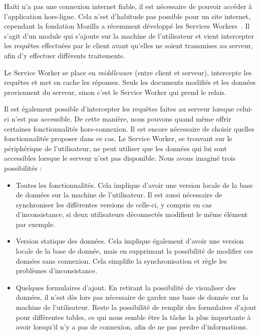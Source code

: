 \documentclass{EPL-master-thesis-covers-FR}
\begin{document}
				Haïti n'a pas une connexion internet fiable, il est nécessaire de pouvoir accéder à l'application hors-ligne. Cela n'est d'habitude pas possible pour un site internet, cependant la fondation Mozilla a récemment développé les Services Workers~\cite{ref:serviceworker}. Il s'agit d'un module qui s'ajoute sur la machine de l'utilisateur et vient intercepter les requêtes effectuées par le client avant qu'elles ne soient transmises au serveur, afin d'y effectuer différents traitements.

				Le Service Worker se place en \emph{middleware} (entre client et serveur), intercepte les requêtes et met en cache les réponses. Seuls les documents modifiés et les données proviennent du serveur, sinon c'est le Service Worker qui prend le relais.

				Il est également possible d'intercepter les requêtes faites au serveur lorsque celui-ci n'est pas accessible. De cette manière, nous pouvons quand même offrir certaines fonctionnalités hors-connexion. Il est encore nécessaire de choisir quelles fonctionnalités proposer dans ce cas. Le Service Worker, se trouvant sur le périphérique de l'utilisateur, ne peut utiliser que les données qui lui sont accessibles lorsque le serveur n'est pas disponible. Nous avons imaginé trois possibilités :

				\begin{itemize}
					\item Toutes les fonctionnalités. Cela implique d'avoir une version locale de la base de données sur la machine de l'utilisateur. Il est aussi nécessaire de synchroniser les différentes versions de celle-ci, y compris en cas d'inconsistance, si deux utilisateurs déconnectés modifient le même élément par exemple.
					\item Version statique des données. Cela implique également d'avoir une version locale de la base de donnée, mais en supprimant la possibilité de modifier ces données sans connexion. Cela simplifie la synchronisation et règle les problèmes d'inconsistance.
					\item Quelques formulaires d'ajout. En retirant la possibilité de visualiser des données, il n'est dès lors pas nécessaire de garder une base de donnée sur la machine de l'utilisateur. Reste la possibilité de remplir des formulaires d'ajout pour différentes tables, ce qui nous semble être la tâche la plus importante à avoir lorsqu'il n'y a pas de connexion, afin de ne pas perdre d'informations.
				\end{itemize}
\end{document}
